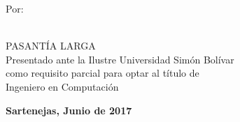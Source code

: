 
\begin{titlepage}
\begin{center}

\usbheader

\bigskip
\bigskip
\bigskip
\bigskip
\bigskip
\bigskip
\bigskip
\bigskip
\bigskip
\bigskip
\bigskip
\bigskip
\bigskip
\bigskip
\bigskip
\bigskip

\begin{minipage}{12cm}
\begin{center}
\textsc{\bfseries\uppercase{\projecttitle}} %
\end{center}
\end{minipage}

\bigskip
\bigskip
\bigskip
\bigskip
\bigskip
\bigskip
\bigskip

\begin{minipage}{\textwidth}
\centering
Por: \\
\projectauthor \\

\end{minipage}

\bigskip
\bigskip
\bigskip
\bigskip
\bigskip
\bigskip
\bigskip
\bigskip
\bigskip

{PASANTÍA LARGA \\ Presentado ante la Ilustre Universidad Simón Bolívar \\
como requisito parcial para optar al título de \\ Ingeniero en Computación} \\

\bigskip
\bigskip
\vfill

{\large \bfseries Sartenejas, Junio de 2017}

\end{center}
\end{titlepage}
